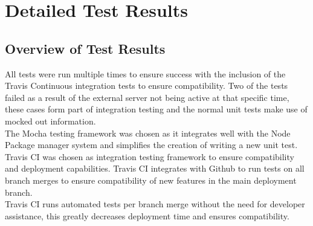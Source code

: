 \documentclass{article}
\begin{document}
\section{Detailed Test Results}\label{sec:testReport}
\subsection{Overview of Test Results}
All tests were run multiple times to ensure success with the inclusion of the Travis Continuous integration tests to ensure compatibility. Two of the tests failed as a result of the external server not being active at that specific time, these cases form part of integration testing and the normal unit tests make use of mocked out information.\\
The Mocha testing framework was chosen as it integrates well with the Node Package manager system and 
simplifies the creation of writing a new unit test.\\
Travis CI was chosen as integration testing framework to ensure compatibility and deployment capabilities. Travis CI integrates with Github to run tests on all branch merges to ensure compatibility of new features in the main deployment branch.\\
Travis CI runs automated tests per branch merge without the need for developer assistance, this greatly decreases deployment time and ensures compatibility.
\end{document}
